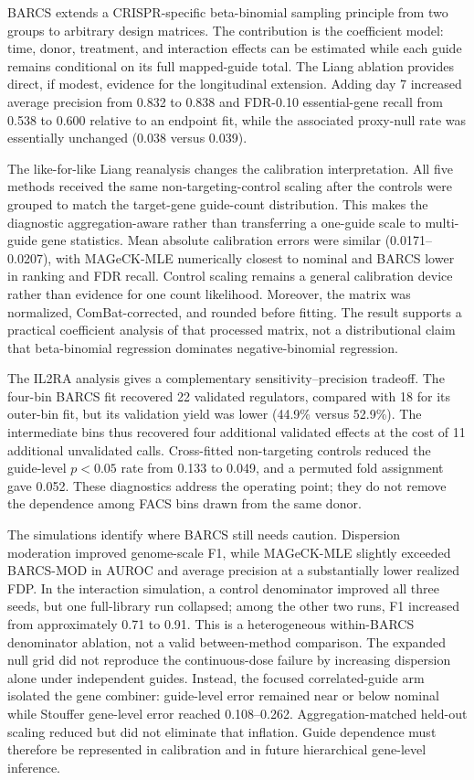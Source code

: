 BARCS extends a CRISPR-specific beta-binomial sampling principle from two
groups to arbitrary design matrices.  The contribution is the coefficient
model: time, donor, treatment, and interaction effects can be estimated while
each guide remains conditional on its full mapped-guide total.  The Liang
ablation provides direct, if modest, evidence for the longitudinal extension.
Adding day 7 increased average precision from 0.832 to 0.838 and
FDR-0.10 essential-gene recall from 0.538 to 0.600 relative to an endpoint
fit, while the associated proxy-null rate was essentially unchanged
(0.038 versus 0.039).

The like-for-like Liang reanalysis changes the calibration interpretation.
All five methods received the same non-targeting-control scaling after the
controls were grouped to match the target-gene guide-count distribution.
This makes the diagnostic aggregation-aware rather than transferring a
one-guide scale to multi-guide gene statistics.  Mean absolute calibration
errors were similar (0.0171--0.0207), with MAGeCK-MLE numerically closest to
nominal and BARCS lower in ranking and FDR recall.  Control scaling remains a
general calibration device rather than evidence for one count likelihood.
Moreover, the matrix was normalized, ComBat-corrected, and rounded before
fitting.  The result supports a practical coefficient analysis of that
processed matrix, not a distributional claim that beta-binomial regression
dominates negative-binomial regression.

The IL2RA analysis gives a complementary sensitivity--precision tradeoff.
The four-bin BARCS fit recovered 22 validated regulators, compared with 18 for
its outer-bin fit, but its validation yield was lower (44.9\% versus 52.9\%).
The intermediate bins thus recovered four additional validated effects at the
cost of 11 additional unvalidated calls.  Cross-fitted non-targeting controls
reduced the guide-level $p<0.05$ rate from 0.133 to 0.049, and a permuted fold
assignment gave 0.052.  These diagnostics address the operating point; they
do not remove the dependence among FACS bins drawn from the same donor.

The simulations identify where BARCS still needs caution.  Dispersion
moderation improved genome-scale F1, while MAGeCK-MLE slightly exceeded
BARCS-MOD in AUROC and average precision at a substantially lower realized
FDP.  In the interaction simulation, a control denominator improved all three
seeds, but one full-library run collapsed; among the other two runs, F1
increased from approximately 0.71 to 0.91.  This is a heterogeneous
within-BARCS denominator ablation, not a valid between-method comparison.
The expanded null grid did not reproduce the continuous-dose failure by
increasing dispersion alone under independent guides.  Instead, the focused
correlated-guide arm isolated the gene combiner: guide-level error remained
near or below nominal while Stouffer gene-level error reached 0.108--0.262.
Aggregation-matched held-out scaling reduced but did not eliminate that
inflation.  Guide dependence must therefore be represented in calibration and
in future hierarchical gene-level inference.

